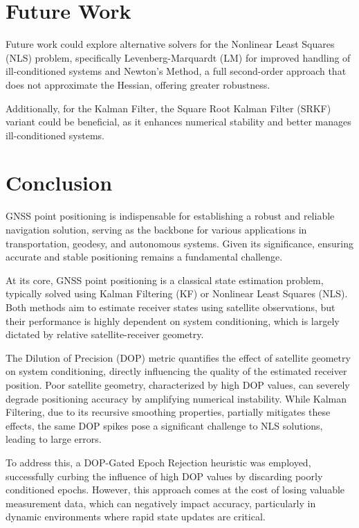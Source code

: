 \documentclass[conference]{IEEEtran}
\begin{document}
\section{Future Work}

Future work could explore alternative solvers for the Nonlinear Least Squares (NLS) problem, specifically Levenberg-Marquardt (LM) for improved handling of ill-conditioned systems and Newton’s Method, a full second-order approach that does not approximate the Hessian, offering greater robustness.

Additionally, for the Kalman Filter, the Square Root Kalman Filter (SRKF) variant could be beneficial, as it enhances numerical stability and better manages ill-conditioned systems.

\section{Conclusion}

GNSS point positioning is indispensable for establishing a robust and reliable navigation solution, serving as the backbone for various applications in transportation, geodesy, and autonomous systems. Given its significance, ensuring accurate and stable positioning remains a fundamental challenge.

At its core, GNSS point positioning is a classical state estimation problem, typically solved using Kalman Filtering (KF) or Nonlinear Least Squares (NLS). Both methods aim to estimate receiver states using satellite observations, but their performance is highly dependent on system conditioning, which is largely dictated by relative satellite-receiver geometry.

The Dilution of Precision (DOP) metric quantifies the effect of satellite geometry on system conditioning, directly influencing the quality of the estimated receiver position. Poor satellite geometry, characterized by high DOP values, can severely degrade positioning accuracy by amplifying numerical instability. While Kalman Filtering, due to its recursive smoothing properties, partially mitigates these effects, the same DOP spikes pose a significant challenge to NLS solutions, leading to large errors.

To address this, a DOP-Gated Epoch Rejection heuristic was employed, successfully curbing the influence of high DOP values by discarding poorly conditioned epochs. However, this approach comes at the cost of losing valuable measurement data, which can negatively impact accuracy, particularly in dynamic environments where rapid state updates are critical.
\end{document}
